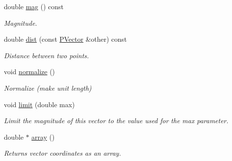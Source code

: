 \begin{DoxyCompactItemize}
\item 
\hypertarget{classcprocessing_1_1PVector_af9d951dc62610be214e933548224c191}{double \hyperlink{classcprocessing_1_1PVector_af9d951dc62610be214e933548224c191}{mag} () const }\label{classcprocessing_1_1PVector_af9d951dc62610be214e933548224c191}

\begin{DoxyCompactList}\small\item\em \-Magnitude. \end{DoxyCompactList}\item 
\hypertarget{classcprocessing_1_1PVector_afd5125d0b45ddc5c4ffdb5a82d2644a5}{double \hyperlink{classcprocessing_1_1PVector_afd5125d0b45ddc5c4ffdb5a82d2644a5}{dist} (const \hyperlink{classcprocessing_1_1PVector}{\-P\-Vector} \&other) const }\label{classcprocessing_1_1PVector_afd5125d0b45ddc5c4ffdb5a82d2644a5}

\begin{DoxyCompactList}\small\item\em \-Distance between two points. \end{DoxyCompactList}\item 
\hypertarget{classcprocessing_1_1PVector_aed64120e52ca58b21e910ca52b9afca0}{void \hyperlink{classcprocessing_1_1PVector_aed64120e52ca58b21e910ca52b9afca0}{normalize} ()}\label{classcprocessing_1_1PVector_aed64120e52ca58b21e910ca52b9afca0}

\begin{DoxyCompactList}\small\item\em \-Normalize (make unit length) \end{DoxyCompactList}\item 
\hypertarget{classcprocessing_1_1PVector_acbb61722faee9258fbb0bad9b47e0582}{void \hyperlink{classcprocessing_1_1PVector_acbb61722faee9258fbb0bad9b47e0582}{limit} (double max)}\label{classcprocessing_1_1PVector_acbb61722faee9258fbb0bad9b47e0582}

\begin{DoxyCompactList}\small\item\em \-Limit the magnitude of this vector to the value used for the max parameter. \end{DoxyCompactList}\item 
\hypertarget{classcprocessing_1_1PVector_a23aec6aff57e8528bf0322b8dcf024ec}{double $\ast$ \hyperlink{classcprocessing_1_1PVector_a23aec6aff57e8528bf0322b8dcf024ec}{array} ()}\label{classcprocessing_1_1PVector_a23aec6aff57e8528bf0322b8dcf024ec}

\begin{DoxyCompactList}\small\item\em \-Returns vector coordinates as an array. \end{DoxyCompactList}\end{DoxyCompactItemize}
